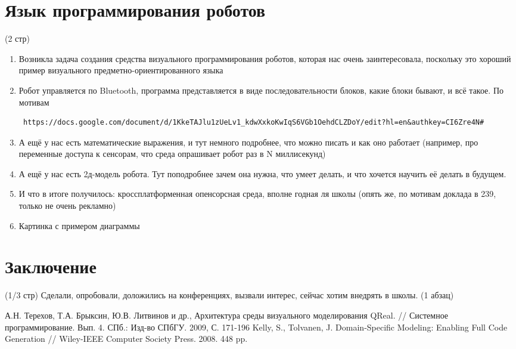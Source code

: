 \documentclass[a5paper]{article}
\begin{document}
\section{Язык программирования роботов} (2 стр)
\begin{enumerate}
  \item Возникла задача создания средства визуального программирования роботов, которая нас очень заинтересовала, поскольку это хороший пример визуального предметно-ориентированного языка
  \item Робот управляется по Bluetooth, программа представляется в виде последовательности блоков, какие блоки бывают, и всё такое. По мотивам \begin{verbatim} https://docs.google.com/document/d/1KkeTAJlu1zUeLv1_kdwXxkoKwIqS6VGb1OehdCLZDoY/edit?hl=en&authkey=CI6Zre4N# \end{verbatim}
  \item А ещё у нас есть математические выражения, и тут немного подробнее, что можно писать и как оно работает (например, про переменные доступа к сенсорам, что среда опрашивает робот раз в N миллисекунд)
  \item А ещё у нас есть 2д-модель робота. Тут поподробнее зачем она нужна, что умеет делать, и что хочется научить её делать в будущем.
  \item И что в итоге получилось: кроссплатформенная опенсорсная среда, вполне годная ля школы (опять же, по мотивам доклада в 239, только не очень рекламно)
  \item Картинка с примером диаграммы
\end{enumerate}

\section*{Заключение} (1/3 стр)
Сделали, опробовали, доложились на конференциях, вызвали интерес, сейчас хотим внедрять в школы. (1 абзац)

\begin{thebibliography}{9001}
   А.Н. Терехов, Т.А. Брыксин, Ю.В. Литвинов и др., Архитектура среды визуального моделирования QReal. // Системное программирование. Вып. 4. СПб.: Изд-во СПбГУ. 2009, С. 171-196
   Kelly, S., Tolvanen, J. Domain-Specific Modeling: Enabling Full Code Generation // Wiley-IEEE Computer Society Press. 2008. 448 pp.
\end{thebibliography}
\end{document}
